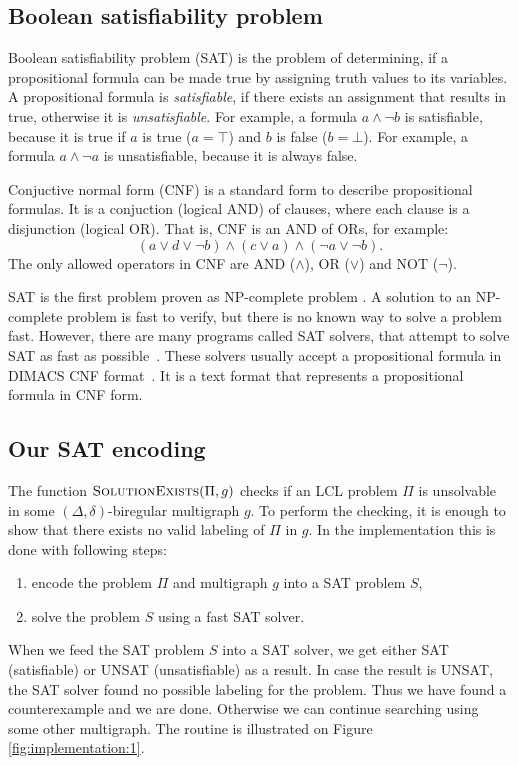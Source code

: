 \subsection{Boolean satisfiability problem} \label{sec:implementation:sat}

Boolean satisfiability problem (SAT) is the problem of determining, if a propositional formula can be made true by assigning truth values to its variables.
A propositional formula is \emph{satisfiable}, if there exists an assignment that results in true, otherwise it is \emph{unsatisfiable}.
For example, a formula $a \land \neg b$ is satisfiable, because it is true if $a$ is true ($a=\top$) and $b$ is false ($b=\bot$).
For example, a formula $a \land \neg a$ is unsatisfiable, because it is always false.

Conjuctive normal form (CNF) is a standard form to describe propositional formulas.
It is a conjuction (logical AND) of clauses, where each clause is a disjunction (logical OR).
That is, CNF is an AND of ORs, for example:
$$(a \lor d \lor \neg b)\land (c \lor a) \land (\neg a \lor  \neg b).$$
The only allowed operators in CNF are AND ($\land$), OR ($\lor$) and NOT ($\neg$).

SAT is the first problem proven as NP-complete problem \cite{DBLP:conf/stoc/Cook71}.
A solution to an NP-complete problem is fast to verify, but there is no known way to solve a problem fast.
However, there are many programs called SAT solvers, that attempt to solve SAT as fast as possible~\cite{TheInternationalSATCompetitionWebPage}.
These solvers usually accept a propositional formula in DIMACS CNF format~\cite{DIMACS:CNF}.
It is a text format that represents a propositional formula in CNF form.


\subsection{Our SAT encoding} \label{sec:implementation:our_sat}


The function $\textsc{SolutionExists}(\Pi, g)$ checks if an LCL problem $\Pi$ is unsolvable in some $(\Delta, \delta)$-biregular multigraph $g$.
To perform the checking, it is enough to show that there exists no valid labeling of $\Pi$ in $g$.
In the implementation this is done with following steps:
\begin{enumerate}
    \item encode the problem $\Pi$ and multigraph $g$ into a SAT problem $S$,
    \item solve the problem $S$ using a fast SAT solver.
\end{enumerate}
When we feed the SAT problem $S$ into a SAT solver, we get either SAT (satisfiable) or UNSAT (unsatisfiable) as a result.
In case the result is UNSAT, the SAT solver found no possible labeling for the problem.
Thus we have found a counterexample and we are done.
Otherwise we can continue searching using some other multigraph.
The routine is illustrated on Figure \ref{fig:implementation:1}.

